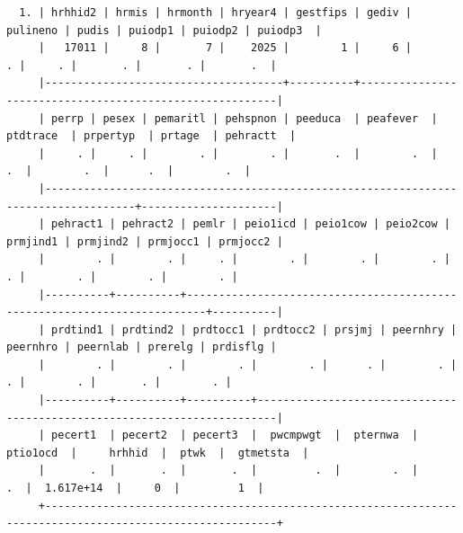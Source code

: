 \documentclass[
]{book}
\begin{document}
\begin{verbatim}
  1. | hrhhid2 | hrmis | hrmonth | hryear4 | gestfips | gediv | pulineno | pudis | puiodp1 | puiodp2 | puiodp3  |
     |   17011 |     8 |       7 |    2025 |        1 |     6 |        . |     . |       . |       . |       .  |
     |-------------------------------------+----------+---------------------------------------------------------|
     | perrp | pesex | pemaritl | pehspnon | peeduca  | peafever  | ptdtrace  | prpertyp  | prtage  | pehractt  |
     |     . |     . |        . |        . |       .  |        .  |        .  |        .  |      .  |        .  |
     |------------------------------------------------------------------------------------+---------------------|
     | pehract1 | pehract2 | pemlr | peio1icd | peio1cow | peio2cow | prmjind1 | prmjind2 | prmjocc1 | prmjocc2 |
     |        . |        . |     . |        . |        . |        . |        . |        . |        . |        . |
     |----------+----------+-------------------------------------------------------------------------+----------|
     | prdtind1 | prdtind2 | prdtocc1 | prdtocc2 | prsjmj | peernhry | peernhro | peernlab | prerelg | prdisflg |
     |        . |        . |        . |        . |      . |        . |        . |        . |       . |        . |
     |----------+----------+----------+-------------------------------------------------------------------------|
     | pecert1  | pecert2  | pecert3  |  pwcmpwgt  |  pternwa  |  ptio1ocd  |     hrhhid  |  ptwk  |  gtmetsta  |
     |       .  |       .  |       .  |         .  |        .  |         .  |  1.617e+14  |     0  |         1  |
     +----------------------------------------------------------------------------------------------------------+


\end{verbatim}
\end{document}
